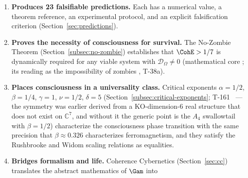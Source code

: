 \begin{enumerate}[leftmargin=2em]
        $M^4 = \mathbb{R}\times S^3$ (T-118--T-120,  as mathematics, reading
        ); colour $SU(3)_C = \mathrm{Stab}_{G_2}(e_O)$ ; the group
        $(SU(3)\times SU(2)\times U(1))/\mathbb{Z}_6$ as the normaliser of colour in
        $\mathrm{Spin}(9)$, chirality of the doublets, horizontal families and one
        complete generation (T-326--T-329,  as mathematics,
         in UHM); 3+1 dimensions of signature $(1,3)$ as the
        colour-singlet part $\mathfrak h_2(\mathbb{C}_O)$ of $\mathfrak h_2(\Oct)$
        (Theorem~48c,  as mathematics,  as physical
        spacetime, with (L)~$\Leftrightarrow$~(P) by Theorem~48e(f)--(i)). The
        Lorentzian signature by the spectral route (T-53) is : the
        $(1,3)$-split plus the relative sign at reflection positivity. The quantum
        formalism itself --- states as density matrices, maps as CPTP channels ---
        is assumed, not derived (Section~\ref{subsec:qm-limit} gives its reading; T-188).
  \item \textbf{Produces 23 falsifiable predictions.} Each has a numerical value, a theorem
        reference, an experimental protocol, and an explicit falsification criterion
        (Section~\ref{sec:predictions}).
  \item \textbf{Proves the necessity of consciousness for survival.} The No-Zombie Theorem
        (Section~\ref{subsec:no-zombie}) establishes that $\CohE > 1/7$ is dynamically
        required for any viable system with $\mathcal{D}_\Omega \neq 0$ (mathematical
        core ; its reading as the impossibility of zombies , T-38a).
  \item \textbf{Places consciousness in a universality class.} Critical
        exponents $\alpha = 1/2$, $\beta = 1/4$, $\gamma = 1$, $\nu = 1/2$,
        $\delta = 5$ (Section~\ref{subsec:critical-exponents};
        T-161~ --- the symmetry was
        earlier derived from a KO-dimension-6 real structure that does not exist on
        $\mathbb{C}^7$, and without it the generic point is the $A_4$ swallowtail with
        $\beta = 1/2$) characterize
        the consciousness phase transition with the same precision that
        $\beta \approx 0.326$ characterizes ferromagnetism, and they
        satisfy the Rushbrooke and Widom scaling relations as equalities.
  \item \textbf{Bridges formalism and life.} Coherence Cybernetics
        (Section~\ref{sec:cc}) translates the abstract mathematics of $\Gam$ into

\end{enumerate}
